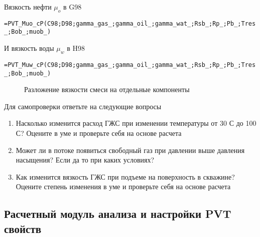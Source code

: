 Вязкость нефти $\mu_{o}$ в G98

{ \small  \texttt{=PVT\_Muo\_cP(C98;D98;gamma\_gas\_;gamma\_oil\_;gamma\_wat\_;Rsb\_;Rp\_;Pb\_;Tres\_;Bob\_;muob\_)}}

И вязкость воды $\mu_{w}$ в H98

{ \small  \texttt{=PVT\_Muw\_cP(C98;D98;gamma\_gas\_;gamma\_oil\_;gamma\_wat\_;Rsb\_;Rp\_;Pb\_;Tres\_;Bob\_;muob\_)}}

\begin{figure}[h!]
	\center{\texttt{[image: Ex30\_4]}}
	\caption{Разложение вязкости смеси на отдельные компоненты}
	\label{ris:Ex30_4}
\end{figure}

Для самопроверки ответьте на следующие вопросы

\begin{enumerate}
	\item Насколько изменится расход ГЖС при изменении температуры от 30 С до 100 С? Оцените в уме и проверьте себя на основе расчета
	\item Может ли в потоке появиться свободный газ при давлении выше давления насыщения? Если да то при каких условиях?
	\item Как изменится вязкость ГЖС при подъеме на поверхность в скважине? Оцените степень изменения в уме и проверьте себя на основе расчета
\end{enumerate}










\subsection{Расчетный модуль анализа и настройки PVT свойств}

